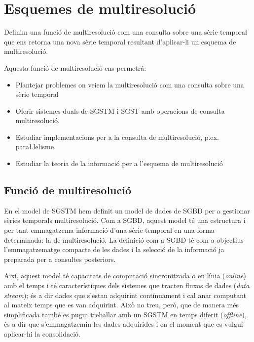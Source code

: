 
\chapter{Esquemes de multiresolució}

\todo{}


Definim una funció de multiresolució com una consulta sobre una sèrie
temporal que ens retorna una nova sèrie temporal resultant
d'aplicar-li un esquema de multiresolució. 

Aquesta funció de multiresolució ens permetrà:

\begin{itemize}
\item Plantejar problemes on veiem la multiresolució com una consulta sobre una sèrie temporal
\item Oferir sistemes duals de \gls{SGSTM} i \gls{SGST} amb operacions
  de consulta multiresolució.
\item Estudiar implementacions per a la consulta de multiresolució, p.ex. para\l.lelisme.
\item Estudiar la teoria de la informació per a l'esquema de multiresolució
\end{itemize}






\section{Funció de multiresolució}

En el model de \gls{SGSTM} hem definit un model de dades de \gls{SGBD}
per a gestionar sèries temporals multiresolució. Com a \gls{SGBD},
aquest model té una estructura i per tant emmagatzema informació d'una
sèrie temporal en una forma determinada: la de multiresolució.  La
definició com a \gls{SGBD} té com a objectius l'emmagatzematge
compacte de les dades i la selecció de la informació ja preparada per
a consultes posteriors. 

Així, aquest model té capacitats de computació
sincronitzada o en línia (\emph{online}) amb el temps i té
característiques dels sistemes que tracten fluxos de dades (\emph{data
  stream}); és a dir dades que s'estan adquirint contínuament i cal
anar computant al mateix temps que es van adquirint. Això no treu,
però, que de manera més simplificada també es pugui treballar amb un
\gls{SGSTM} en temps diferit (\emph{offline}), és a dir que
s'emmagatzemin les dades adquirides i en el moment que es vulgui
aplicar-hi la consolidació.




